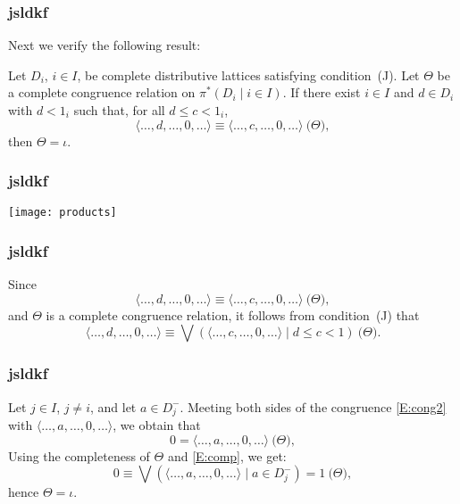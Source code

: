 \documentclass{beamer}
\begin{document}
\begin{frame}
	\frametitle{jsldkf}
Next we verify the following result:

\begin{theorem}\label{T:P*} 
Let $D_{i}$, $i \in I$, be complete distributive 
lattices satisfying condition~\textup{(J)}.  
Let $\Theta$ be a complete congruence relation on 
$\pi^{*} ( D_{i} \mid i \in I )$. 
If there exist $i \in I$ and $d \in D_{i}$ with 
$d < 1_{i}$ such that, for all $d \leq c < 1_{i}$, 
\begin{equation*}\label{E:cong1} 
   \langle \dots, d, \dots, 0, \dots \rangle \equiv 
   \langle \dots, c, \dots, 0, \dots \rangle 
   \pod{\Theta}, 
\end{equation*}
then $\Theta = \iota$.
\end{theorem}
\end{frame}

\begin{frame}
	\frametitle{jsldkf}
\centering\texttt{[image: products]}
\end{frame}

\begin{frame}
	\frametitle{jsldkf}
Since 
\begin{equation*}\label{E:cong2}
\langle \dots, d, \dots, 0, \dots \rangle \equiv 
\langle \dots, c, \dots, 0, \dots \rangle 
\pod{\Theta}, 
\end{equation*}
and $\Theta$ is a complete congruence relation, 
it follows from condition~(J) that
\begin{equation*}\label{E:cong}
 \langle \dots, d, \dots, 0, \dots \rangle \equiv
 \bigvee ( \langle \dots, c, \dots, 0, \dots \rangle 
 \mid d \leq c < 1 ) \pod{\Theta}. 
\end{equation*}
\end{frame}

\begin{frame}
	\frametitle{jsldkf}
Let $j \in I$, $j \neq i$, and let $a \in D_{j}^{-}$. 
Meeting both sides of the congruence \eqref{E:cong2} 
with $\langle \dots, a, \dots, 0, \dots \rangle$, 
we obtain that
\begin{equation*}\label{E:comp}
   0 = \langle \dots, a, \dots, 0, \dots \rangle 
     \pod{\Theta}, 
\end{equation*}
Using the completeness of $\Theta$ and \eqref{E:comp}, 
we get:
\[
   0 \equiv \bigvee ( \langle \dots, a, \dots, 0, 
     \dots \rangle \mid a \in D_{j}^{-} ) = 1 
     \pod{\Theta}, 
\]
hence $\Theta = \iota$.
\end{frame}
\end{document}
